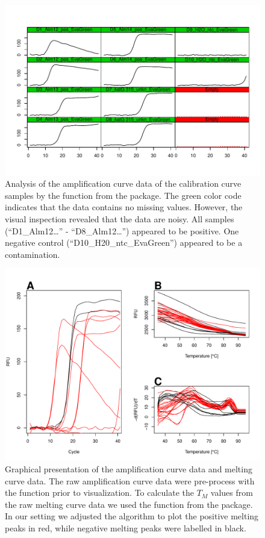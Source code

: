 \begin{figure}[htbp]
  \centering
  \includegraphics{figures/plotCurves.pdf}
  \caption{Analysis of the amplification curve data of the calibration curve 
samples by the  function from the  package. 
The green color code indicates that the data contains no missing values. 
However, the visual inspection revealed that the data are noisy. All samples 
(``D1\_Alm12\ldots'' - ``D8\_Alm12\ldots'') appeared to be positive. One 
negative control (``D10\_H20\_ntc\_EvaGreen'') appeared to be a contamination.}
  \label{figure:plotCurves}
\end{figure}

\begin{figure}[htbp]
  \centering
  \includegraphics[clip=true, width=16cm]{figures/amp_melt.pdf}
  \caption{Graphical presentation of the amplification curve data and melting 
curve data.  The raw amplification curve data were pre-process with 
the  function prior to visualization. To calculate the $T_{M}$ values 
from the raw melting curve data  we used the  function 
from the  package.  In our setting we adjusted the algorithm to 
plot the positive melting peaks in red, while negative melting peaks were 
labelled in black.} 
\label{figure:amp_melt}
\end{figure}

